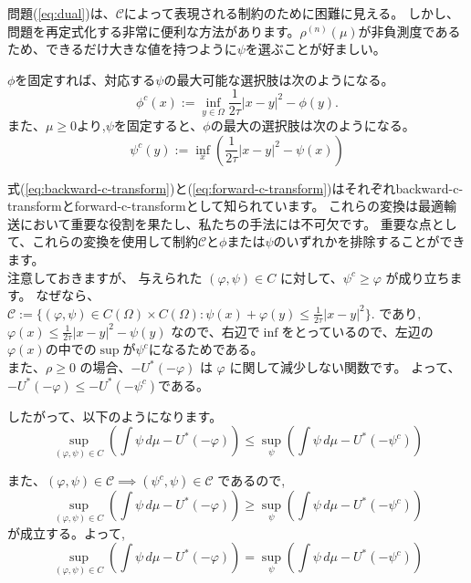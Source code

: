 \documentclass{jsarticle}
\theoremstyle{definition}
\begin{document}
問題(\ref{eq:dual})は、$\mathcal{C}$によって表現される制約のために困難に見える。
しかし、問題を再定式化する非常に便利な方法があります。$\rho^{(n)}(\mu)$が非負測度であるため、できるだけ大きな値を持つように$\psi$を選ぶことが好ましい。

$\phi$を固定すれば、対応する$\psi$の最大可能な選択肢は次のようになる。
\begin{equation}
    \label{eq:backward-c-transform}
    \phi^c(x) := \inf_{y\in\Omega} \frac{1}{2 \tau}|x - y|^2 - \phi(y).
\end{equation}
また、$\mu \ge 0$より,$\psi$を固定すると、$\phi$の最大の選択肢は次のようになる。
\begin{equation}
    \label{eq:forward-c-transform}
    \psi^c(y) := \inf_x \left( \frac{1}{2\tau}|x-y|^2 - \psi(x)\right)
\end{equation}


式(\ref{eq:backward-c-transform})と(\ref{eq:forward-c-transform})はそれぞれbackward-c-transformとforward-c-transformとして知られています。
これらの変換は最適輸送において重要な役割を果たし、私たちの手法には不可欠です。
重要な点として、これらの変換を使用して制約$\mathcal{C}$と$\phi$または$\psi$のいずれかを排除することができます。\\

注意しておきますが、
{\color{teal}
与えられた \((\varphi, \psi) \in C\) に対して、{\color{red}\(\psi^c \geq \varphi\) }が成り立ちます。
}
なぜなら、
$
    \mathcal{C}  := \{(\varphi, \psi) \in C(\Omega) \times C(\Omega) : \psi(x) + \varphi(y) \leq \frac{1}{2 \tau} |x - y|^2 \}. 
$
であり,
$
  \varphi(x) \le \frac{1}{2\tau}|x-y|^2 - \psi(y)
$
なので、右辺で$\inf$をとっているので、左辺の$\varphi(x)$の中での$\sup$が$\psi^c$になるためである。\\

また、\(\rho \geq 0\) の場合、\(- U^*(-\varphi)\) は \(\varphi\) に関して減少しない関数です。
よって、{\color{red}$-U^*(- \varphi) \le -U^*(- \psi^c)$}である。


したがって、以下のようになります。
\[
\sup_{(\varphi, \psi) \in C} \left(\int \psi \, d\mu - U^*(- \varphi)\right) \le \sup_\psi \left(\int \psi \, d\mu - U^*(- \psi^c)\right)
\]

また、$(\varphi, \psi) \in \mathcal{C} \implies (\psi^c, \psi) \in \mathcal{C}$
であるので,
\[
\sup_{(\varphi, \psi) \in C} \left(\int \psi \, d\mu - U^*(- \varphi)\right) \ge \sup_\psi \left(\int \psi \, d\mu - U^*(- \psi^c)\right)
\]
が成立する。よって,
\begin{equation}
  \label{eq:psi^c}
\sup_{(\varphi, \psi) \in C} \left(\int \psi \, d\mu - U^*(- \varphi)\right) = \sup_\psi \left(\int \psi \, d\mu - U^*(- \psi^c)\right)
\end{equation}
\end{document}

